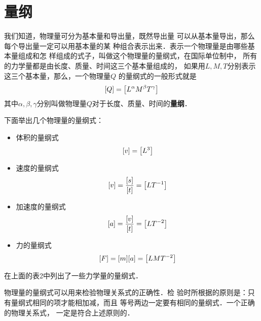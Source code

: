 \chapter{量纲}

我们知道，物理量可分为基本量和导出量，既然导出量
可以从基本量导出，那么每个导出量一定可以用基本量的某
种组合表示出来．表示一个物理量是由哪些基本量组成和怎
样组成的式子，叫做这个物理量的量纲式，在国际单位制中，
所有的力学量都是由长度、质量、时间这三个基本量组成的，
如果用$L,M,T$分别表示这三个基本量，那么，一个物理量$Q$
的量纲式的一般形式就是
\[[Q]=\qty[L^{\alpha}M^{\beta}T^{\gamma}]\]
其中$\alpha, \beta, \gamma$分别叫做物理量$Q$对于长度、质量、时间的\textbf{量纲}．

下面举出几个物理量的量纲式：
\begin{itemize}
    \item 体积的量纲式
    \[[v]=\qty[L^3]  \]
    \item 速度的量纲式
    \[[v]=\frac{[s]}{[t]}=\qty[LT^{-1}]  \] 
    \item 加速度的量纲式
    \[ [a]=\frac{[v]}{[t]}=\qty[LT^{-2}] \]
    \item 力的量纲式
    \[ [F]=[m][a]=\qty[LMT^{-2}] \]
\end{itemize}

在上面的表2中列出了一些力学量的量纲式．

物理量的量纲式可以用来检验物理关系式的正确性．检
验时所根据的原则是：只有量纲式相同的项才能相加减，而且
等号两边一定要有相同的量纲式．一个正确的物理关系式，
一定是符合上述原则的．






